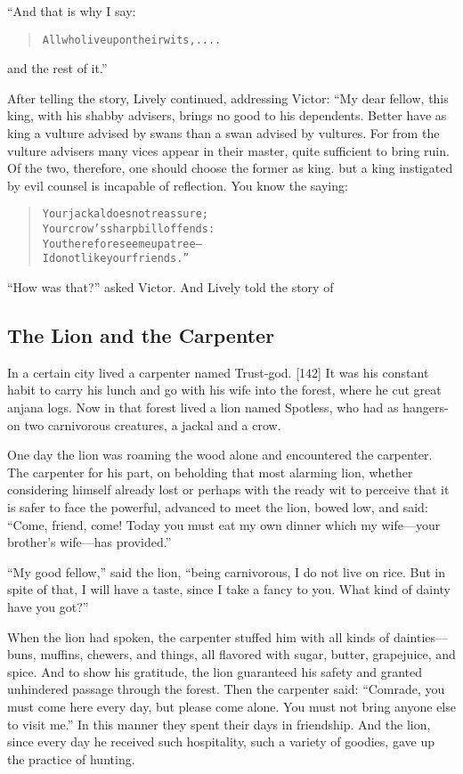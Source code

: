 \documentclass[article, twoside, 14pt]{memoir}
\renewenvironment{verbatim}{%
\begin{quote}%
\vskip -10pt%
\begin{alltt}\normalfont\large}{\end{alltt}%
\end{quote}%
\vskip -10pt
} %
\begin{document}
“And that is why I say:

\begin{verbatim}
All who live upon their wits,....
\end{verbatim}
and the rest of it.”

After telling the story, Lively continued, addressing Victor: “My
dear fellow, this king, with his shabby advisers, brings no good to
his dependents. Better have as king a vulture advised by swans than
a swan advised by vultures. For from the vulture advisers many
vices appear in their master, quite sufficient to bring ruin. Of
the two, therefore, one should choose the former as king. but a
king instigated by evil counsel is incapable of reflection. You
know the saying:

\begin{verbatim}
Your jackal does not reassure;
    Your crow's sharp bill offends:
You therefore see me up a tree--
    I do not like your friends.”
\end{verbatim}
``How was that?'' asked Victor. And Lively told the story of

\subsection{The Lion and the Carpenter}

\label{s17}

In a certain city lived a carpenter named Trust-god. [142] It was
his constant habit to carry his lunch and go with his wife into the
forest, where he cut great anjana logs. Now in that forest lived a
lion named Spotless, who had as hangers-on two carnivorous
creatures, a jackal and a crow.

One day the lion was roaming the wood alone and encountered the
carpenter. The carpenter for his part, on beholding that most
alarming lion, whether considering himself already lost or perhaps
with the ready wit to perceive that it is safer to face the
powerful, advanced to meet the lion, bowed low, and said:
``Come, friend, come! Today you must eat my own dinner which my wife---your brother's wife---has provided.''

``My good fellow,'' said the lion,
``being carnivorous, I do not live on rice. But in spite of that, I will have a taste, since I take a fancy to you. What kind of dainty have you got?''

When the lion had spoken, the carpenter stuffed him with all kinds
of dainties---buns, muffins, chewers, and things, all flavored with
sugar, butter, grapejuice, and spice. And to show his gratitude,
the lion guaranteed his safety and granted unhindered passage
through the forest. Then the carpenter said:
``Comrade, you must come here every day, but please come alone. You must not bring anyone else to visit me.''
In this manner they spent their days in friendship. And the lion,
since every day he received such hospitality, such a variety of
goodies, gave up the practice of hunting.
\end{document}

